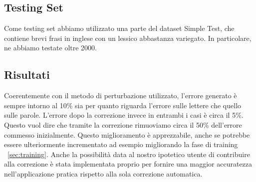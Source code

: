 \subsection{Testing Set}
Come testing set abbiamo utilizzato una parte del dataset Simple Test, che contiene brevi frasi in inglese con un lessico abbastanza variegato. In particolare, ne abbiamo testate oltre 2000.  

\subsection{Risultati}
Coerentemente con il metodo di perturbazione utilizzato, l'errore generato è sempre intorno al 10\% sia per quanto riguarda l'errore sulle lettere che quello sulle parole. L'errore dopo la correzione invece in entrambi i casi è circa il 5\%. Questo vuol dire che tramite la correzione rimuoviamo circa il 50\% dell'errore commesso inizialmente. Questo miglioramento è apprezzabile, anche se potrebbe essere ulteriormente incrementato ad esempio migliorando la fase di training ~\ref{sec:training}. Anche la possibilità data al nostro ipotetico utente di contribuire alla correzione è stata implementata proprio per fornire una maggior accuratezza nell'applicazione pratica rispetto alla sola correzione automatica.

